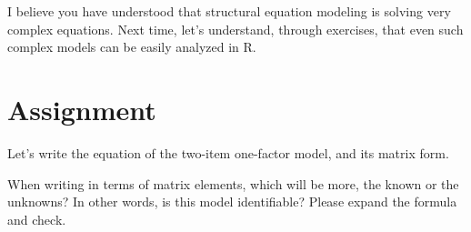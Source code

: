 \documentclass{ltjsbook}
\begin{document}
I believe you have understood that structural equation modeling is solving very complex equations.
Next time, let's understand, through exercises, that even such complex models can be easily analyzed in R.
\section{Assignment}
Let's write the equation of the two-item one-factor model, and its matrix form.

When writing in terms of matrix elements, which will be more, the known or the unknowns? In other words, is this model identifiable? Please expand the formula and check.
\end{document}
